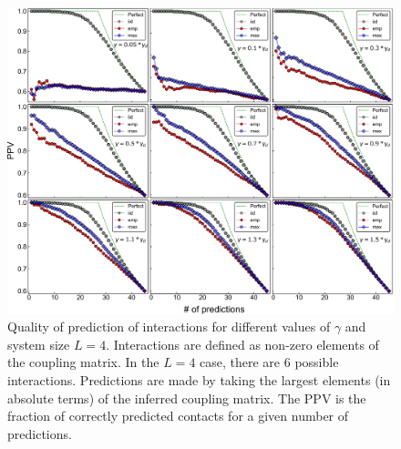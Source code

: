 \documentclass[preprint,amsmath,amssymb,superscriptaddress,showpacs,pre]{revtex4-1}
\providecommand{\DIFaddbeginFL}{} %
\providecommand{\DIFaddendFL}{} %
\providecommand{\DIFdelbeginFL}{} %
\providecommand{\DIFdelendFL}{} %
\newcommand{\DIFscaledelfig}{0.5}
\newlength{\DIFdelgraphicswidth} %
\newlength{\DIFdelgraphicsheight} %
\newcommand{\DIFaddincludegraphics}[2][]{{\color{blue}\fbox{\DIFOincludegraphics[#1]{#2}}}} %
\newcommand{\DIFdelincludegraphics}[2][]{%
\sbox{\DIFdelgraphicsbox}{\DIFOincludegraphics[#1]{#2}}%
\settoboxwidth{\DIFdelgraphicswidth}{\DIFdelgraphicsbox} %
\settoboxtotalheight{\DIFdelgraphicsheight}{\DIFdelgraphicsbox} %
\scalebox{\DIFscaledelfig}{%
\parbox[b]{\DIFdelgraphicswidth}{\usebox{\DIFdelgraphicsbox}\\[-\baselineskip] \rule{\DIFdelgraphicswidth}{0em}}\llap{\resizebox{\DIFdelgraphicswidth}{\DIFdelgraphicsheight}{%
\setlength{\unitlength}{\DIFdelgraphicswidth}%
\begin{picture}(1,1)%
\thicklines\linethickness{2pt} %
{\color[rgb]{1,0,0}\put(0,0){\framebox(1,1){}}}%
{\color[rgb]{1,0,0}\put(0,0){\line( 1,1){1}}}%
{\color[rgb]{1,0,0}\put(0,1){\line(1,-1){1}}}%
\end{picture}%
}\hspace*{3pt}}} %
} %
\DeclareRobustCommand{\DIFaddbeginFL}{\DIFOaddbeginFL \let\includegraphics\DIFaddincludegraphics} %
\DeclareRobustCommand{\DIFaddendFL}{\DIFOaddendFL \let\includegraphics\DIFOincludegraphics} %
\DeclareRobustCommand{\DIFdelbeginFL}{\DIFOdelbeginFL \let\includegraphics\DIFdelincludegraphics} %
\DeclareRobustCommand{\DIFdelendFL}{\DIFOaddendFL \let\includegraphics\DIFOincludegraphics} %
\begin{document}
  
\begin{figure}[!htb]
	\centering
	\DIFdelbeginFL %
\DIFdelendFL \DIFaddbeginFL \includegraphics[keepaspectratio=true,width=1.0\textwidth]{Figures/PPVs_L10.pdf}
	\DIFaddendFL \caption{Quality of prediction of interactions for  different values of $\gamma$ and system size $L=4$. Interactions are defined as non-zero elements of the coupling matrix. In the $L=4$ case, there are $6$ possible interactions. Predictions are made by taking the largest elements (in absolute terms) of the inferred coupling matrix. The PPV is the fraction of correctly predicted contacts for a given number of predictions.}
	\label{fig:PPV_L10}
\end{figure}
\end{document}
